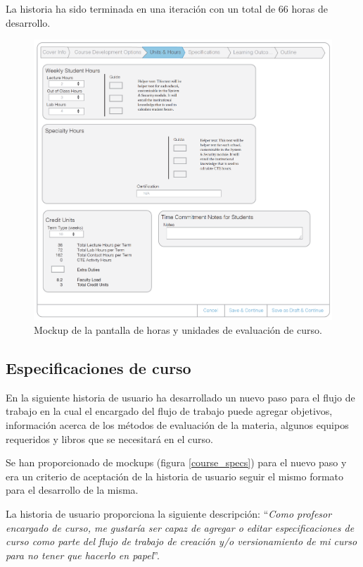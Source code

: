 La historia ha sido terminada en una iteración con un total de 66 horas de desarrollo.

\begin{figure}[H]
\centering
\includegraphics[scale=0.3]{Capitulos/DesarrollodelaAplicacion/Imagenes/course_units_hours}
\caption{Mockup de la pantalla de horas y unidades de evaluación de curso.}
  \label{course_units_hours}
\end{figure}

\subsection{Especificaciones de curso}
En la siguiente historia de usuario ha desarrollado un nuevo paso para el flujo de trabajo en la cual el encargado del flujo de trabajo puede agregar objetivos, información acerca de los métodos de evaluación de la materia, algunos equipos requeridos y libros que se necesitará en el curso.

Se han proporcionado de mockups (figura \ref{course_specs}) para el nuevo paso y era un criterio de aceptación de la historia de usuario seguir el mismo formato para el desarrollo de la misma.

La historia de usuario proporciona la siguiente descripción: \enquote{\textit{Como profesor encargado de curso, me gustaría ser capaz de agregar o editar especificaciones de curso como parte del flujo de trabajo de creación y/o versionamiento de mi curso para no tener que hacerlo en papel}}.

